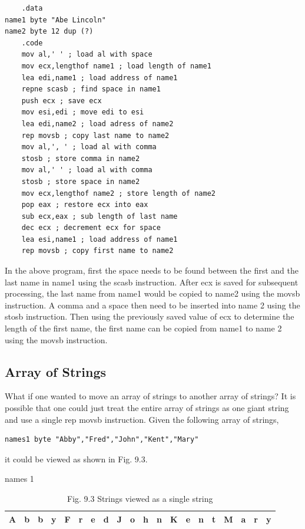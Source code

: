 \documentclass[10pt]{article}
\begin{document}
\begin{verbatim}
    .data
name1 byte "Abe Lincoln"
name2 byte 12 dup (?)
    .code
    mov al,' ' ; load al with space
    mov ecx,lengthof name1 ; load length of name1
    lea edi,name1 ; load address of name1
    repne scasb ; find space in name1
    push ecx ; save ecx
    mov esi,edi ; move edi to esi
    lea edi,name2 ; load adress of name2
    rep movsb ; copy last name to name2
    mov al,', ' ; load al with comma
    stosb ; store comma in name2
    mov al,' ' ; load al with comma
    stosb ; store space in name2
    mov ecx,lengthof name2 ; store length of name2
    pop eax ; restore ecx into eax
    sub ecx,eax ; sub length of last name
    dec ecx ; decrement ecx for space
    lea esi,name1 ; load address of name1
    rep movsb ; copy first name to name2
\end{verbatim}

In the above program, first the space needs to be found between the first and the last name in name1 using the scasb instruction. After ecx is saved for subsequent processing, the last name from name1 would be copied to name2 using the movsb instruction. A comma and a space then need to be inserted into name 2 using the stosb instruction. Then using the previously saved value of ecx to determine the length of the first name, the first name can be copied from name1 to name 2 using the movsb instruction.

\subsection*{Array of Strings}
What if one wanted to move an array of strings to another array of strings? It is possible that one could just treat the entire array of strings as one giant string and use a single rep movsb instruction. Given the following array of strings,

\begin{verbatim}
names1 byte "Abby","Fred","John","Kent","Mary"
\end{verbatim}

it could be viewed as shown in Fig. 9.3.

\begin{table}[h]
\begin{center}
names 1\\
\begin{tabular}{|l|l|l|l|l|l|l|l|l|l|l|l|l|l|l|l|l|l|l|l|}
\hline
A & b & b & y & F & r & e & d & J & o & h & n & K & e & n & t & M & a & r & y \\
\hline
\end{tabular}
\captionsetup{labelformat=empty}
\caption{Fig. 9.3 Strings viewed as a single string}
\end{center}
\end{table}
\end{document}
